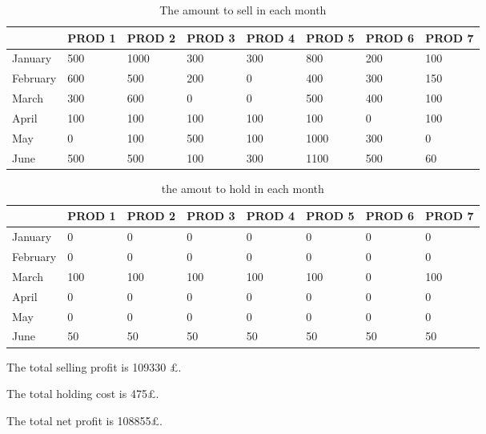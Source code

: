\documentclass[12pt,a4paper]{article}
\theoremstyle{definition}
\begin{document}
        \begin{table}[htbp]\caption{The amount to sell in each month}
        	\scriptsize
        	\centering
        	\renewcommand\arraystretch{1.1}
        	\begin{tabular}{m{} m{}<{\centering} m{}<{\centering} m{}<{\centering} m{}<{\centering} m{}<{\centering} m{}<{\centering} m{}<{\centering}}
        		\hline
        		& \textbf{PROD 1} & \textbf{PROD 2} & \textbf{PROD 3} & \textbf{PROD 4} & \textbf{PROD 5} & \textbf{PROD 6} &  \textbf{PROD 7} \\\hline
        		January & 500 & 1000 & 300 & 300 & 800 & 200 & 100 \\
        		February & 600 & 500 & 200 & 0 & 400 & 300 & 150 \\
        		March & 300 & 600 & 0 & 0 & 500 & 400 & 100 \\
        		April & 100 & 100 & 100 & 100 & 100 & 0 & 100 \\
        		May & 0 & 100 & 500 & 100 & 1000 & 300 & 0 \\
        		June & 500 & 500 & 100 & 300 & 1100 & 500 & 60 \\
        		\hline
        	\end{tabular}
        \end{table}

        \begin{table}[htbp]\caption{the amout to hold in each month}
        	\scriptsize
        	\centering
        	\renewcommand\arraystretch{1.1}
        	\begin{tabular}{m{} m{}<{\centering} m{}<{\centering} m{}<{\centering} m{}<{\centering} m{}<{\centering} m{}<{\centering} m{}<{\centering}}
        		\hline
        		& \textbf{PROD 1} & \textbf{PROD 2} & \textbf{PROD 3} & \textbf{PROD 4} & \textbf{PROD 5} & \textbf{PROD 6} &  \textbf{PROD 7} \\\hline
        		January & 0 & 0 & 0 & 0 & 0 & 0 & 0 \\
        		February & 0 & 0 & 0 & 0 & 0 & 0 & 0 \\
        		March & 100 & 100 &100 & 100 & 100 & 0 & 100 \\
        		April & 0 & 0 & 0 & 0 & 0 & 0 & 0 \\
        		May & 0 & 0 & 0 & 0 & 0 & 0 & 0 \\
        		June & 50 & 50 & 50 & 50 & 50 & 50 & 50 \\
        		\hline
        	\end{tabular}
        \end{table}

        The total selling profit is 109330 \pounds.
        
        The total holding cost is 475\pounds.
        
        The total net profit is 108855\pounds.
	

    
       


\end{document}
